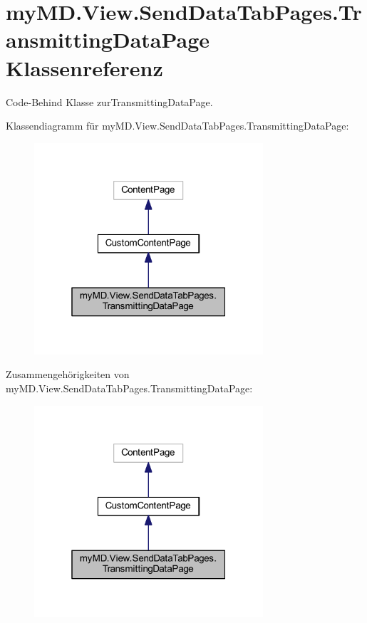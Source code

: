 \hypertarget{classmy_m_d_1_1_view_1_1_send_data_tab_pages_1_1_transmitting_data_page}{}\section{my\+M\+D.\+View.\+Send\+Data\+Tab\+Pages.\+Transmitting\+Data\+Page Klassenreferenz}
\label{classmy_m_d_1_1_view_1_1_send_data_tab_pages_1_1_transmitting_data_page}


Code-\/\+Behind Klasse zur\+Transmitting\+Data\+Page.  




Klassendiagramm für my\+M\+D.\+View.\+Send\+Data\+Tab\+Pages.\+Transmitting\+Data\+Page\+:
\nopagebreak
\begin{figure}[H]
\begin{center}
\leavevmode
\includegraphics[width=241pt]{classmy_m_d_1_1_view_1_1_send_data_tab_pages_1_1_transmitting_data_page__inherit__graph}
\end{center}
\end{figure}


Zusammengehörigkeiten von my\+M\+D.\+View.\+Send\+Data\+Tab\+Pages.\+Transmitting\+Data\+Page\+:
\nopagebreak
\begin{figure}[H]
\begin{center}
\leavevmode
\includegraphics[width=241pt]{classmy_m_d_1_1_view_1_1_send_data_tab_pages_1_1_transmitting_data_page__coll__graph}
\end{center}
\end{figure}
